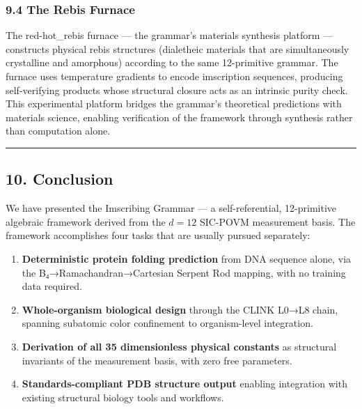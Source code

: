 \hypertarget{the-rebis-furnace}{%
\subsubsection{9.4 The Rebis Furnace}\label{the-rebis-furnace}}

The red-hot\_rebis furnace --- the grammar's materials synthesis
platform --- constructs physical rebis structures (dialetheic materials
that are simultaneously crystalline and amorphous) according to the same
12-primitive grammar. The furnace uses temperature gradients to encode
imscription sequences, producing self-verifying products whose
structural closure acts as an intrinsic purity check. This experimental
platform bridges the grammar's theoretical predictions with materials
science, enabling verification of the framework through synthesis rather
than computation alone.

\begin{center}\rule{0.5\linewidth}{0.5pt}\end{center}

\hypertarget{conclusion}{%
\subsection{10. Conclusion}\label{conclusion}}

We have presented the Imscribing Grammar --- a self-referential,
12-primitive algebraic framework derived from the \(d=12\) SIC-POVM
measurement basis. The framework accomplishes four tasks that are
usually pursued separately:

\begin{enumerate}
\def\labelenumi{\arabic{enumi}.}
\item
  \textbf{Deterministic protein folding prediction} from DNA sequence
  alone, via the B₄→Ramachandran→Cartesian Serpent Rod mapping, with no
  training data required.
\item
  \textbf{Whole-organism biological design} through the CLINK L0→L8
  chain, spanning subatomic color confinement to organism-level
  integration.
\item
  \textbf{Derivation of all 35 dimensionless physical constants} as
  structural invariants of the measurement basis, with zero free
  parameters.
\item
  \textbf{Standards-compliant PDB structure output} enabling integration
  with existing structural biology tools and workflows.
\end{enumerate}

